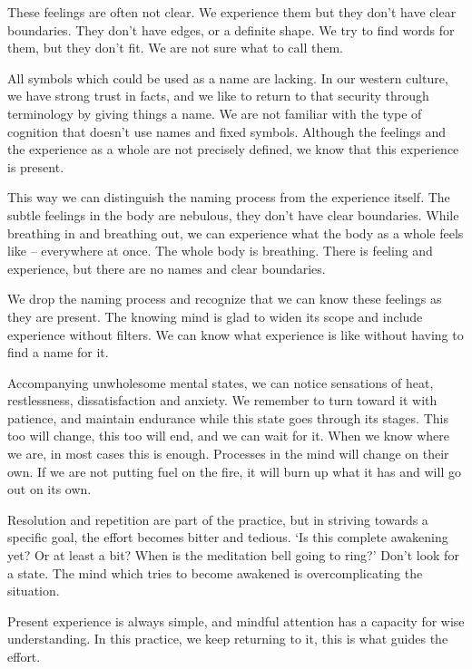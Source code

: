 These feelings are often not clear. We experience them but they don't
have clear boundaries. They don't have edges, or a definite shape. We
try to find words for them, but they don't fit. We are not sure what to
call them.

All symbols which could be used as a name are lacking. In our western
culture, we have strong trust in facts, and we like to return to that
security through terminology by giving things a name. We are not
familiar with the type of cognition that doesn't use names and fixed
symbols. Although the feelings and the experience as a whole are not
precisely defined, we know that this experience is present.

This way we can distinguish the naming process from the experience
itself. The subtle feelings in the body are nebulous, they don't have
clear boundaries. While breathing in and breathing out, we can
experience what the body as a whole feels like -- everywhere at once.
The whole body is breathing. There is feeling and experience, but there
are no names and clear boundaries.

We drop the naming process and recognize that we can know these feelings
as they are present. The knowing mind is glad to widen its scope and
include experience without filters. We can know what experience is like
without having to find a name for it.


Accompanying unwholesome mental states, we can notice sensations of
heat, restlessness, dissatisfaction and anxiety. We remember to turn
toward it with patience, and maintain endurance while this state goes
through its stages. This too will change, this too will end, and we can
wait for it. When we know where we are, in most cases this is enough.
Processes in the mind will change on their own. If we are not putting
fuel on the fire, it will burn up what it has and will go out on its
own.

Resolution and repetition are part of the practice, but in striving
towards a specific goal, the effort becomes bitter and tedious. `Is this
complete awakening yet? Or at least a bit? When is the meditation bell
going to ring?' Don't look for a state. The mind which tries to become
awakened is overcomplicating the situation.

Present experience is always simple, and mindful attention has a
capacity for wise understanding. In this practice, we keep returning to
it, this is what guides the effort.

